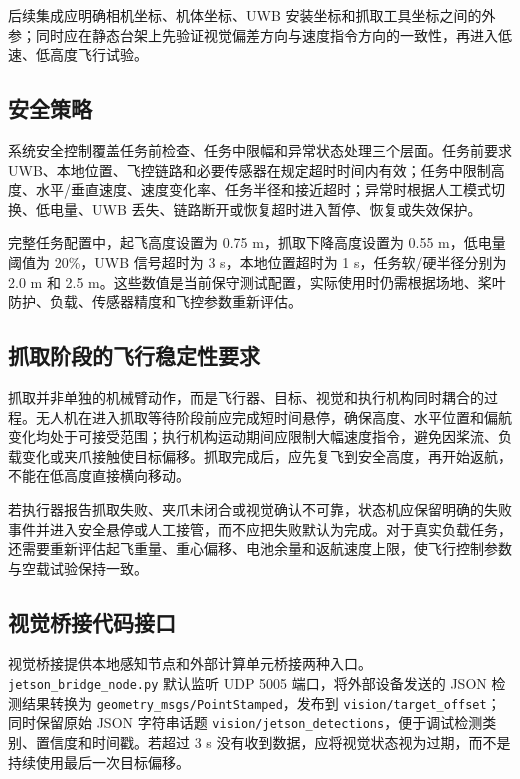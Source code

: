\documentclass[12pt,a4paper]{ctexart}
\providecommand{\allowbreak}{\penalty0\relax}
\begin{document}
后续集成应明确相机坐标、机体坐标、UWB 安装坐标和抓取工具坐标之间的外参；同时应在静态台架上先验证视觉偏差方向与速度指令方向的一致性，再进入低速、低高度飞行试验。

\subsection{安全策略}
系统安全控制覆盖任务前检查、任务中限幅和异常状态处理三个层面。任务前要求 UWB、本地位置、飞控链路和必要传感器在规定超时时间内有效；任务中限制高度、水平/垂直速度、速度变化率、任务半径和接近超时；异常时根据人工模式切换、低电量、UWB 丢失、链路断开或恢复超时进入暂停、恢复或失效保护。

完整任务配置中，起飞高度设置为 0.75 m，抓取下降高度设置为 0.55 m，低电量阈值为 20\%，UWB 信号超时为 3 s，本地位置超时为 1 s，任务软/硬半径分别为 2.0 m 和 2.5 m。这些数值是当前保守测试配置，实际使用时仍需根据场地、桨叶防护、负载、传感器精度和飞控参数重新评估。

\subsection{抓取阶段的飞行稳定性要求}
抓取并非单独的机械臂动作，而是飞行器、目标、视觉和执行机构同时耦合的过程。无人机在进入抓取等待阶段前应完成短时间悬停，确保高度、水平位置和偏航变化均处于可接受范围；执行机构运动期间应限制大幅速度指令，避免因桨流、负载变化或夹爪接触使目标偏移。抓取完成后，应先复飞到安全高度，再开始返航，不能在低高度直接横向移动。

若执行器报告抓取失败、夹爪未闭合或视觉确认不可靠，状态机应保留明确的失败事件并进入安全悬停或人工接管，而不应把失败默认为完成。对于真实负载任务，还需要重新评估起飞重量、重心偏移、电池余量和返航速度上限，使飞行控制参数与空载试验保持一致。

\subsection{视觉桥接代码接口}
视觉桥接提供本地感知节点和外部计算单元桥接两种入口。\texttt{jetson\_bridge\_}\allowbreak\texttt{node.py} 默认监听 UDP 5005 端口，将外部设备发送的 JSON 检测结果转换为 \texttt{geometry\_msgs/}\allowbreak\texttt{PointStamped}，发布到 \texttt{vision/}\allowbreak\texttt{target\_offset}；同时保留原始 JSON 字符串话题 \texttt{vision/}\allowbreak\texttt{jetson\_detections}，便于调试检测类别、置信度和时间戳。若超过 3 s 没有收到数据，应将视觉状态视为过期，而不是持续使用最后一次目标偏移。
\end{document}
